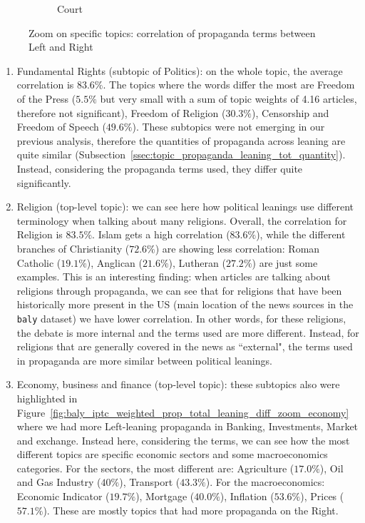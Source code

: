 \begin{figure}[!htbp]
\begin{subfigure}{0.45\textwidth}
		\caption{Court}
            \label{fig:baly_iptc_weighted_prop_leaning_corr_tfidf_zoom_court}
	\end{subfigure}
	
    \caption{Zoom on specific topics: correlation of propaganda terms between Left and Right}
    \label{fig:baly_iptc_weighted_prop_leaning_corr_tfidf_zoom}
\end{figure}

\begin{enumerate}
    \item Fundamental Rights (subtopic of Politics): on the whole topic, the average correlation is $83.6\%$. The topics where the words differ the most are Freedom of the Press ($5.5\%$ but very small with a sum of topic weights of 4.16 articles, therefore not significant), Freedom of Religion ($30.3\%$), Censorship and Freedom of Speech ($49.6\%$). These subtopics were not emerging in our previous analysis, therefore the quantities of propaganda across leaning are quite similar (Subsection~\ref{ssec:topic_propaganda_leaning_tot_quantity}). Instead, considering the propaganda terms used, they differ quite significantly.
    \item Religion (top-level topic): we can see here how political leanings use different terminology when talking about many religions. Overall, the correlation for Religion is $83.5\%$. Islam gets a high correlation ($83.6\%$), while the different branches of Christianity ($72.6\%$) are showing less correlation: Roman Catholic ($19.1\%$), Anglican ($21.6\%$), Lutheran ($27.2\%$) are just some examples. This is an interesting finding: when articles are talking about religions through propaganda, we can see that for religions that have been historically more present in the US (main location of the news sources in the \texttt{baly} dataset) we have lower correlation. In other words, for these religions, the debate is more internal and the terms used are more different. Instead, for religions that are generally covered in the news as ``external", the terms used in propaganda are more similar between political leanings.
    \item Economy, business and finance (top-level topic): these subtopics also were highlighted in Figure~\ref{fig:baly_iptc_weighted_prop_total_leaning_diff_zoom_economy} where we had more Left-leaning propaganda in Banking, Investments, Market and exchange. Instead here, considering the terms, we can see how the most different topics are specific economic sectors and some macroeconomics categories. For the sectors, the most different are: Agriculture ($17.0\%$), Oil and Gas Industry ($40\%$), Transport ($43.3\%$). For the macroeconomics: Economic Indicator ($19.7\%$), Mortgage ($40.0\%$), Inflation ($53.6\%$), Prices ($57.1\%$). These are mostly topics that had more propaganda on the Right.

\end{enumerate}
